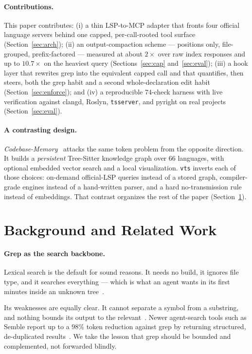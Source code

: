 \documentclass[11pt]{article}
\begin{document}
\paragraph{Contributions.}
This paper contributes: (i) a thin LSP-to-MCP adapter that fronts four official
language servers behind one capped, per-call-rooted tool surface
(Section~\ref{sec:arch}); (ii) an output-compaction scheme --- positions only,
file-grouped, prefix-factored --- measured at about $2\times$ over raw index
responses and up to $10.7\times$ on the heaviest query (Sections~\ref{sec:cap}
and~\ref{sec:eval}); (iii) a hook layer that rewrites grep into the equivalent
capped call and that quantifies, then steers, both the grep habit and a second
whole-declaration edit habit (Section~\ref{sec:enforce}); and (iv) a reproducible
74-check harness with live verification against clangd, Roslyn, \texttt{tsserver},
and pyright on real projects (Section~\ref{sec:eval}).

\paragraph{A contrasting design.}
\emph{Codebase-Memory}~\cite{cbm} attacks the same token problem from the opposite
direction. It builds a \emph{persistent} Tree-Sitter knowledge graph over 66
languages, with optional embedded vector search and a local visualization.
\texttt{vts} inverts each of those choices: on-demand official-LSP queries instead
of a stored graph, compiler-grade engines instead of a hand-written parser, and a
hard no-transmission rule instead of embeddings. That contrast organizes the rest
of the paper (Section~\ref{sec:related}).

\section{Background and Related Work}
\label{sec:related}

\paragraph{Grep as the search backbone.}
Lexical search is the default for sound reasons. It needs no build, it ignores file
type, and it searches everything --- which is what an agent wants in its first
minutes inside an unknown tree~\cite{yage-grep}.

Its weaknesses are equally clear. It cannot separate a symbol from a substring, and
nothing bounds its output to the relevant~\cite{lsp-medium}. Newer agent-search
tools such as Semble report up to a $98\%$ token reduction against grep by returning
structured, de-duplicated results~\cite{semble-hn}. We take the lesson that grep
should be bounded and complemented, not forwarded blindly.
\end{document}
